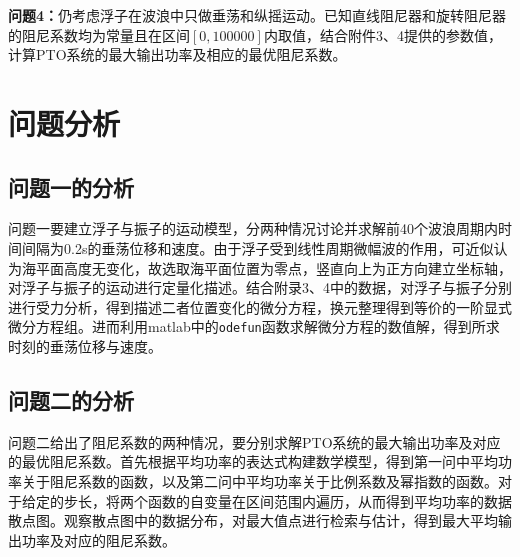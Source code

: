 \documentclass{article}
\numberwithin{equation}{subsection}
\begin{document}
\textbf{问题4：}仍考虑浮子在波浪中只做垂荡和纵摇运动。已知直线阻尼器和旋转阻尼器的阻尼系数均为常量且在区间$[0,100000]$内取值，结合附件3、4提供的参数值，计算PTO系统的最大输出功率及相应的最优阻尼系数。






{\centering\section{问题分析}}

\subsection{问题一的分析}
问题一要建立浮子与振子的运动模型，分两种情况讨论并求解前40个波浪周期内时间间隔为0.2s的垂荡位移和速度。由于浮子受到线性周期微幅波的作用，可近似认为海平面高度无变化，故选取海平面位置为零点，竖直向上为正方向建立坐标轴，对浮子与振子的运动进行定量化描述。结合附录3、4中的数据，对浮子与振子分别进行受力分析，得到描述二者位置变化的微分方程，换元整理得到等价的一阶显式微分方程组。进而利用matlab中的\verb|odefun|函数求解微分方程的数值解，得到所求时刻的垂荡位移与速度。%
\subsection{问题二的分析}
问题二给出了阻尼系数的两种情况，要分别求解PTO系统的最大输出功率及对应的最优阻尼系数。首先根据平均功率的表达式构建数学模型，得到第一问中平均功率关于阻尼系数的函数，以及第二问中平均功率关于比例系数及幂指数的函数。对于给定的步长，将两个函数的自变量在区间范围内遍历，从而得到平均功率的数据散点图。观察散点图中的数据分布，对最大值点进行检索与估计，得到最大平均输出功率及对应的阻尼系数。
\end{document}
